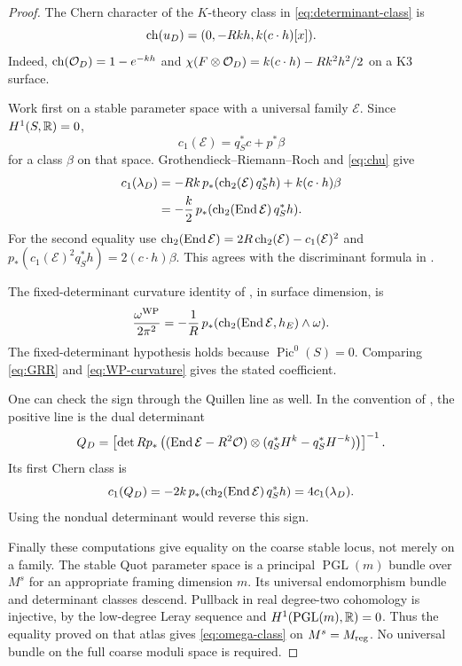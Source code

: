 \begin{proof}
The Chern character of the $K$-theory class in
\eqref{eq:determinant-class} is
\begin{equation}\label{eq:chu}
 \operatorname{ch}(u_D)=(0,-Rkh,k(c\cdot h)[x]).
\end{equation}
Indeed, $\operatorname{ch}(\mathcal O_D)=1-e^{-kh}$ and
$\chi(F\otimes\mathcal O_D)=k(c\cdot h)-Rk^2h^2/2$
on a K3 surface.

Work first on a stable parameter space with a universal
family $\mathcal E$. Since $H^1(S,\mathbb R)=0$,
\[
 c_1(\mathcal E)=q_S^*c+p^*\beta
\]
for a class $\beta$ on that space. Grothendieck--Riemann--Roch
and \eqref{eq:chu} give
\begin{align}
 c_1(\lambda_D)
 &=-Rk\,p_*(\operatorname{ch}_2(\mathcal E)\,q_S^*h)
                  +k(c\cdot h)\beta \notag\\
 &=-\frac{k}{2}\,p_*(\operatorname{ch}_2(\operatorname{End}\mathcal E)\,q_S^*h).
                                                    \label{eq:GRR}
\end{align}
For the second equality use
$\operatorname{ch}_2(\operatorname{End}\mathcal E)=2R\operatorname{ch}_2(\mathcal E)-c_1(\mathcal E)^2$
and
$p_*(c_1(\mathcal E)^2q_S^*h)=2(c\cdot h)\beta$.
This agrees with the discriminant formula in
\cite[Proposition~8.3.1(ii)]{hl97}.

The fixed-determinant curvature identity of
\cite[Proposition~4.3, equation~(4.6)]{biswas16}, in
surface dimension, is
\begin{equation}\label{eq:WP-curvature}
 \frac{\omega^{\mathrm{WP}}}{2\pi^2}
   =-\frac1R\,p_*(\operatorname{ch}_2(\operatorname{End}\mathcal E,h_E)\wedge\omega).
\end{equation}
The fixed-determinant hypothesis holds because
$\operatorname{Pic}^0(S)=0$. Comparing
\eqref{eq:GRR} and \eqref{eq:WP-curvature} gives the stated
coefficient.

One can check the sign through the Quillen line as well.
In the convention of \cite[Theorem~4.6, equations~(4.11)
and~(4.13)]{biswas16}, the positive line is the dual
determinant
\begin{equation}\label{eq:Quillen}
 Q_D=\left[\det Rp_*\left(
 (\operatorname{End}\mathcal E-R^2\mathcal O)\otimes
                   (q_S^*H^k-q_S^*H^{-k})\right)\right]^{-1}.
\end{equation}
Its first Chern class is
\[
 c_1(Q_D)=-2k\,p_*(\operatorname{ch}_2(\operatorname{End}\mathcal E)\,q_S^*h)
                  =4c_1(\lambda_D).
\]
Using the nondual determinant would reverse this sign.

Finally these computations give equality on the coarse
stable locus, not merely on a family. The stable Quot
parameter space is a principal $\operatorname{PGL}(m)$
bundle over $M^s$ for an appropriate framing dimension
$m$. Its universal endomorphism bundle and determinant
classes descend. Pullback in real degree-two cohomology
is injective, by the low-degree Leray sequence and
$H^1(\operatorname{PGL}(m),\mathbb R)=0$. Thus the equality
proved on that atlas gives \eqref{eq:omega-class} on
$M^s=M_{\mathrm{reg}}$. No universal bundle on the full coarse
moduli space is required.
\end{proof}

